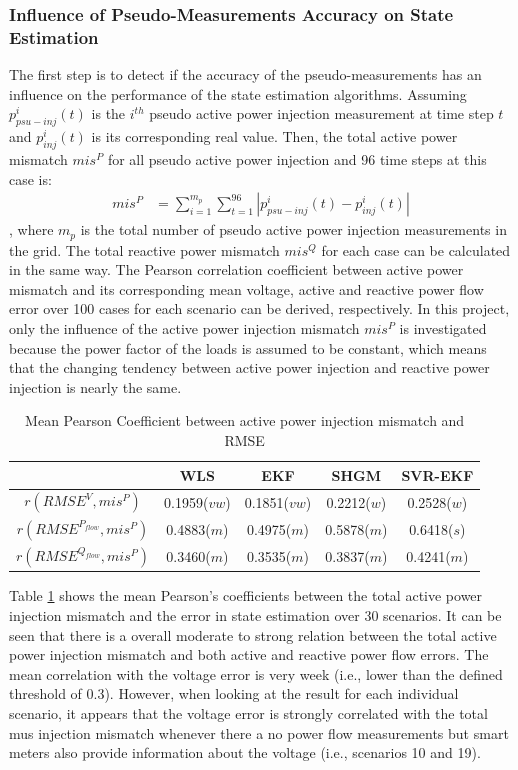 \subsubsection{Influence of Pseudo-Measurements Accuracy on State Estimation}
The first step is to detect if the accuracy of the pseudo-measurements has an influence on the performance of the state estimation algorithms. Assuming $p_{psu-inj}^i(t)$ is the $i^{th}$ pseudo active power injection measurement at time step $t$ and $p_{inj}^i(t)$ is its corresponding real value. Then, the total active power mismatch $mis^{P}$ for all pseudo active power injection and 96 time steps at this case is:
\begin{align}
    mis^{P} &= \sum_{i=1}^{m_p} \sum_{t=1}^{96} |p_{psu-inj}^i(t)-p_{inj}^i(t)|
    \label{eq:total_mismatch}
\end{align}
, where $m_p$ is the total number of pseudo active power injection measurements in the grid. The total reactive power mismatch $mis^{Q}$ for each case can be calculated in the same way. The Pearson correlation coefficient between active power mismatch and its corresponding mean voltage, active and reactive power flow error over 100 cases for each scenario can be derived, respectively. In this project, only the influence of the active power injection mismatch $mis^{P}$ is investigated because the power factor of the loads is assumed to be constant, which means that the changing tendency between active power injection and reactive power injection is nearly the same.
    \begin{table}[!h]
        \centering
        \begin{tabular}{c|c|c|c|c}
             & WLS & EKF & SHGM & SVR-EKF\\ \hline
            $r(RMSE^V,mis^{P})$ & 0.1959($vw$) & 0.1851($vw$) & 0.2212($w$) &  0.2528($w$)\\
            $r(RMSE^{P_{flow}},mis^{P})$ & 0.4883($m$) & 0.4975($m$) & 0.5878($m$) &  0.6418($s$)\\
            $r(RMSE^{Q_{flow}},mis^{P})$ & 0.3460($m$) & 0.3535($m$) & 0.3837($m$) &  0.4241($m$)\\
        \end{tabular}
        \caption{Mean Pearson Coefficient between active power injection mismatch and RMSE}
        \label{tab:pearson_mis_error}
    \end{table}
Table \ref{tab:pearson_mis_error} shows the mean Pearson's coefficients between the total active power injection mismatch and the error in state estimation over 30 scenarios. It can be seen that there is a overall moderate to strong relation between the total active power injection mismatch and both active and reactive power flow errors. The mean correlation with the voltage error is very week (i.e., lower than the defined threshold of 0.3). However, when looking at the result for each individual scenario, it appears that the voltage error is strongly correlated with the total mus injection mismatch whenever there a no power flow measurements but smart meters also provide information about the voltage (i.e., scenarios 10 and 19).
